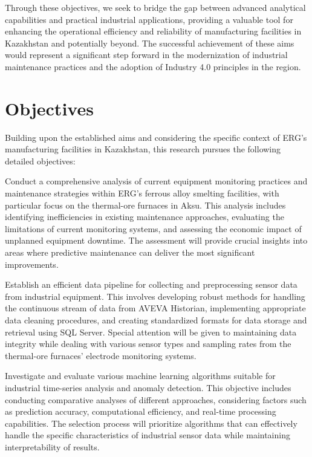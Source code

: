 Through these objectives, we seek to bridge the gap between advanced analytical capabilities and practical industrial applications, providing a valuable tool for enhancing the operational efficiency and reliability of manufacturing facilities in Kazakhstan and potentially beyond. The successful achievement of these aims would represent a significant step forward in the modernization of industrial maintenance practices and the adoption of Industry 4.0 principles in the region.

\section{Objectives}

Building upon the established aims and considering the specific context of ERG's manufacturing facilities in Kazakhstan, this research pursues the following detailed objectives:

Conduct a comprehensive analysis of current equipment monitoring practices and maintenance strategies within ERG's ferrous alloy smelting facilities, with particular focus on the thermal-ore furnaces in Aksu. This analysis includes identifying inefficiencies in existing maintenance approaches, evaluating the limitations of current monitoring systems, and assessing the economic impact of unplanned equipment downtime. The assessment will provide crucial insights into areas where predictive maintenance can deliver the most significant improvements.

Establish an efficient data pipeline for collecting and preprocessing sensor data from industrial equipment. This involves developing robust methods for handling the continuous stream of data from AVEVA Historian, implementing appropriate data cleaning procedures, and creating standardized formats for data storage and retrieval using SQL Server. Special attention will be given to maintaining data integrity while dealing with various sensor types and sampling rates from the thermal-ore furnaces' electrode monitoring systems.

Investigate and evaluate various machine learning algorithms suitable for industrial time-series analysis and anomaly detection. This objective includes conducting comparative analyses of different approaches, considering factors such as prediction accuracy, computational efficiency, and real-time processing capabilities. The selection process will prioritize algorithms that can effectively handle the specific characteristics of industrial sensor data while maintaining interpretability of results.

